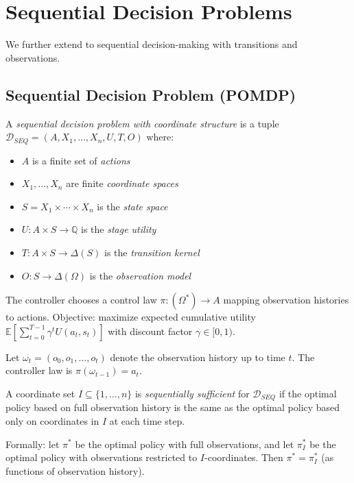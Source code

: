 \section{Sequential Decision Problems}\label{sec:sequential}

We further extend to sequential decision-making with transitions and observations.

\subsection{Sequential Decision Problem (POMDP)}

\begin{definition}\label{def:sequential-decision-problem}
A \emph{sequential decision problem with coordinate structure} is a tuple $\mathcal{D}_{SEQ} = (A, X_1, \ldots, X_n, U, T, O)$ where:
\begin{itemize}
\item $A$ is a finite set of \emph{actions}
\item $X_1, \ldots, X_n$ are finite \emph{coordinate spaces}
\item $S = X_1 \times \cdots \times X_n$ is the \emph{state space}
\item $U : A \times S \to \mathbb{Q}$ is the \emph{stage utility}
\item $T : A \times S \to \Delta(S)$ is the \emph{transition kernel}
\item $O : S \to \Delta(\Omega)$ is the \emph{observation model}
\end{itemize}
The controller chooses a control law $\pi : (\Omega^*) \to A$ mapping observation histories to actions. Objective: maximize expected cumulative utility $\mathbb{E}\left[\sum_{t=0}^{T-1} \gamma^t U(a_t, s_t)\right]$ with discount factor $\gamma \in [0,1)$.
\end{definition}

\begin{notation}
Let $\omega_t = (o_0, o_1, \ldots, o_t)$ denote the observation history up to time $t$. The controller law is $\pi(\omega_{t-1}) = a_t$.
\end{notation}

\begin{definition}\label{def:sequential-sufficient}
A coordinate set $I \subseteq \{1, \ldots, n\}$ is \emph{sequentially sufficient} for $\mathcal{D}_{SEQ}$ if the optimal policy based on full observation history is the same as the optimal policy based only on coordinates in $I$ at each time step.

Formally: let $\pi^*$ be the optimal policy with full observations, and let $\pi_I^*$ be the optimal policy with observations restricted to $I$-coordinates. Then $\pi^* = \pi_I^*$ (as functions of observation history).
\end{definition}

